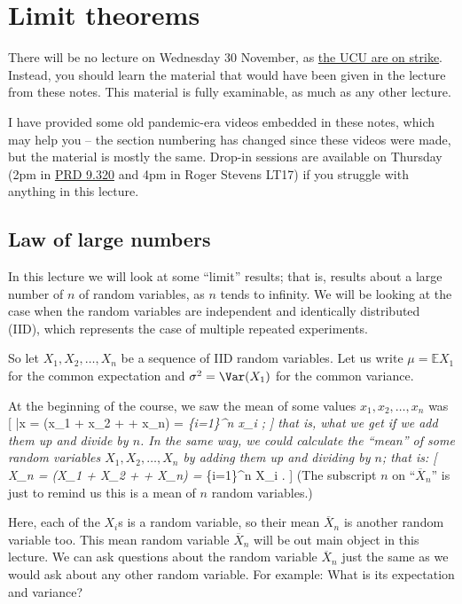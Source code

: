 \documentclass[
  letterpaper,
]{report}
\theoremstyle{definition}
\theoremstyle{definition}
\theoremstyle{remark}
\begin{document}
\hypertarget{L18-limit}{%
\chapter{Limit theorems}\label{L18-limit}}

There will be no lecture on Wednesday 30 November, as
\href{https://www.leedsucu.org.uk/information-for-students-2/}{the UCU
are on strike}. Instead, you should learn the material that would have
been given in the lecture from these notes. This material is fully
examinable, as much as any other lecture.

I have provided some old pandemic-era videos embedded in these notes,
which may help you -- the section numbering has changed since these
videos were made, but the material is mostly the same. Drop-in sessions
are available on Thursday (2pm in
\href{https://mpaldridge.github.io/office.html}{PRD 9.320} and 4pm in
Roger Stevens LT17) if you struggle with anything in this lecture.

\hypertarget{lln}{%
\section{Law of large numbers}\label{lln}}

In this lecture we will look at some ``limit'' results; that is, results
about a large number of \(n\) of random variables, as \(n\) tends to
infinity. We will be looking at the case when the random variables are
independent and identically distributed (IID), which represents the case
of multiple repeated experiments.

So let \(X_1, X_2, \dots, X_n\) be a sequence of IID random variables.
Let us write \(\mu = \mathbb EX_1\) for the common expectation and
\(\sigma^2 = \Var(X_1)\) for the common variance.

At the beginning of the course, we saw the mean of some values
\(x_1, x_2, \dots, x_n\) was {[} \bar x =  (x\_1 + x\_2 +
\cdots + x\_n) =  \sum\emph{\{i=1\}\^{}n x\_i ; {]} that is,
what we get if we add them up and divide by \(n\). In the same way, we
could calculate the ``mean'' of some random variables
\(X_1, X_2, \dots, X_n\) by adding them up and dividing by \(n\); that
is: {[} \overline X\_n =  (X\_1 + X\_2 + \cdots + X\_n) =
 \sum}\{i=1\}\^{}n X\_i . {]} (The subscript \(n\) on
``\(\overline X_n\)'' is just to remind us this is a mean of \(n\)
random variables.)

Here, each of the \(X_i\)s is a random variable, so their mean
\(\overline X_n\) is another random variable too. This mean random
variable \(\overline X_n\) will be out main object in this lecture. We
can ask questions about the random variable \(\overline X_n\) just the
same as we would ask about any other random variable. For example: What
is its expectation and variance?
\end{document}
